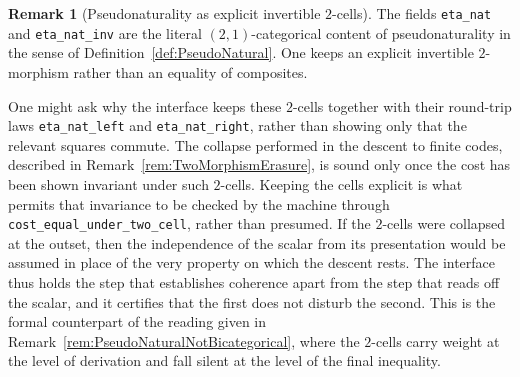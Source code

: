 \documentclass[10pt, reqno]{amsart}
\theoremstyle{plain}
\theoremstyle{definition}
\newtheorem{remark}[theorem]{Remark}
\theoremstyle{plain}
\begin{document}
\begin{remark}[Pseudonaturality as explicit invertible $2$-cells]\label{rem:CoqPseudoNat}
The fields \texttt{eta\_nat} and \texttt{eta\_nat\_inv} are the literal $(2,1)$-categorical content of pseudonaturality in the sense of Definition~\ref{def:PseudoNatural}. One keeps an explicit invertible $2$-morphism rather than an equality of composites.

One might ask why the interface keeps these $2$-cells together with their round-trip laws \texttt{eta\_nat\_left} and \texttt{eta\_nat\_right}, rather than showing only that the relevant squares commute. The collapse performed in the descent to finite codes, described in Remark~\ref{rem:TwoMorphismErasure}, is sound only once the cost has been shown invariant under such $2$-cells. Keeping the cells explicit is what permits that invariance to be checked by the machine through \texttt{cost\_equal\_under\_two\_cell}, rather than presumed. If the $2$-cells were collapsed at the outset, then the independence of the scalar from its presentation would be assumed in place of the very property on which the descent rests. The interface thus holds the step that establishes coherence apart from the step that reads off the scalar, and it certifies that the first does not disturb the second. This is the formal counterpart of the reading given in Remark~\ref{rem:PseudoNaturalNotBicategorical}, where the $2$-cells carry weight at the level of derivation and fall silent at the level of the final inequality.
\end{remark}
\end{document}
